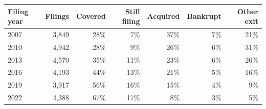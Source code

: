 \begin{tabular}{lrrrrrr}
\toprule
Filing year & Filings & Covered & Still filing & Acquired & Bankrupt & Other exit \\
\midrule
2007 & 3{,}849 & 28\% & 7\% & 37\% & 7\% & 21\% \\
2010 & 4{,}942 & 28\% & 9\% & 26\% & 6\% & 31\% \\
2013 & 4{,}570 & 35\% & 11\% & 23\% & 6\% & 26\% \\
2016 & 4{,}193 & 44\% & 13\% & 21\% & 5\% & 16\% \\
2019 & 3{,}917 & 56\% & 16\% & 15\% & 4\% & 9\% \\
2022 & 4{,}388 & 67\% & 17\% & 8\% & 3\% & 5\% \\
\bottomrule
\end{tabular}
